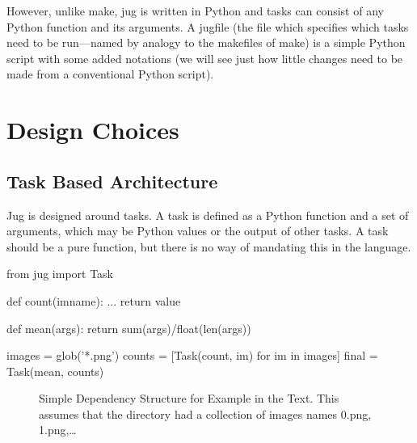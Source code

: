 \documentclass{article}
\let\code\texttt
\begin{document}
However, unlike make, jug is written in Python and tasks can consist of any
Python function and its arguments. A jugfile (the file which specifies which
tasks need to be run---named by analogy to the makefiles of make) is a simple
Python script with some added notations (we will see just how little changes
need to be made from a conventional Python script).

\section{Design Choices}
\subsection{Task Based Architecture}

Jug is designed around tasks. A task is defined as a Python function and a set
of arguments, which may be Python values or the output of other tasks. A task
should be a pure function, but there is no way of mandating this in the
language.

\begin{python}
from jug import Task

def count(imname):
    ...
    return value

def mean(args):
    return sum(args)/float(len(args))

images = glob('*.png')
counts = [Task(count, im) for im in images]
final = Task(mean, counts)
\end{python}

\begin{figure}
\begin{center}

\end{center}
\caption{Simple Dependency Structure for Example in the Text. This assumes that
the directory had a collection of images names 0.png, 1.png,\ldots}
\label{fig:jug-deps}
\end{figure}
\end{document}
